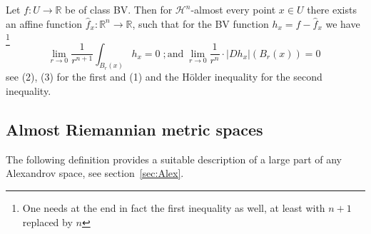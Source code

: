 \documentclass[12pt,leqno]{amsart}
\numberwithin{equation}{section}
\theoremstyle{definition}
\theoremstyle{remark}
\newcommand{\R}{\mathbb{R}}
\def\co{\colon\thinspace}
\begin{document}
Let $f:U\to \R$ be of class BV.  Then  for $\mathcal H^n$-almost every point
$x\in U$ there exists an affine  function $\hat f _x:\R^n\to \R$, such that for the BV function $h_x=f-\hat f_x$  we have \footnote{\color{blue} One needs at the end  in fact the first inequality as well, at least with $n+1$ replaced by $n$}
\begin{equation}\label{DC-ae-diff}
\lim_{r\to 0}\frac 1 {r^{n+1}}  \int _{B_r(x)} h_x =0 \; ; \text{and} \;     \lim _{r\to 0}  \frac 1 {r^n} \cdot   |Dh_x| (B_r (x)) =0 \;
\end{equation}
see \cite[ Theorem 6.1]{Evans} (2), (3) for the first and (1) and the H\"older inequality for the second inequality.



\subsection{Almost Riemannian metric spaces}
The following definition provides a suitable description of a  large part of any Alexandrov space, see section~\ref{sec:Alex}.
\end{document}
